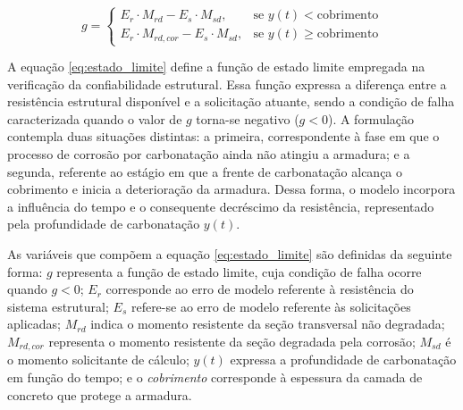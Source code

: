 \begin{equation}\label{eq:estado_limite}
g = 
\begin{cases}
E_r \cdot M_{rd} - E_s \cdot M_{sd}, & \text{se } y(t) < \text{cobrimento} \\
E_r \cdot M_{rd,cor} - E_s \cdot M_{sd}, & \text{se } y(t) \geq \text{cobrimento}
\end{cases}
\end{equation}

A equação \eqref{eq:estado_limite} define a função de estado limite empregada na verificação da confiabilidade estrutural. Essa função expressa a diferença entre a resistência estrutural disponível e a solicitação atuante, sendo a condição de falha caracterizada quando o valor de $g$ torna-se negativo ($g < 0$). A formulação contempla duas situações distintas: a primeira, correspondente à fase em que o processo de corrosão por carbonatação ainda não atingiu a armadura; e a segunda, referente ao estágio em que a frente de carbonatação alcança o cobrimento e inicia a deterioração da armadura. Dessa forma, o modelo incorpora a influência do tempo e o consequente decréscimo da resistência, representado pela profundidade de carbonatação $y(t)$.

As variáveis que compõem a equação \eqref{eq:estado_limite} são definidas da seguinte forma:
$g$ representa a função de estado limite, cuja condição de falha ocorre quando $g < 0$;
$E_r$ corresponde ao erro de modelo referente à resistência do sistema estrutural;
$E_s$ refere-se ao erro de modelo referente às solicitações aplicadas;
$M_{rd}$ indica o momento resistente da seção transversal não degradada;
$M_{rd,cor}$ representa o momento resistente da seção degradada pela corrosão;
$M_{sd}$ é o momento solicitante de cálculo;
$y(t)$ expressa a profundidade de carbonatação em função do tempo;
e o \textit{cobrimento} corresponde à espessura da camada de concreto que protege a armadura.

